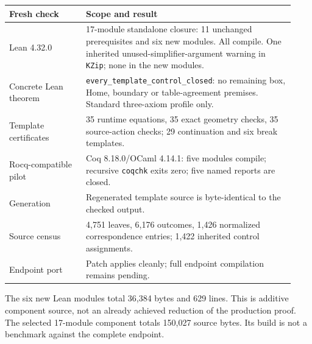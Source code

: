 \begin{center}
\begin{tabular}{@{}p{0.25\linewidth}p{0.68\linewidth}@{}}
\toprule Fresh check & Scope and result\\\midrule
Lean 4.32.0 & 17-module standalone closure: 11 unchanged prerequisites and six new modules. All compile. One inherited unused-simplifier-argument warning in \texttt{KZip}; none in the new modules.\\
Concrete Lean theorem & \texttt{every\_template\_control\_closed}: no remaining box, Home, boundary or table-agreement premises. Standard three-axiom profile only.\\
Template certificates & 35 runtime equations, 35 exact geometry checks, 35 source-action checks; 29 continuation and six break templates.\\
Rocq-compatible pilot & Coq 8.18.0/OCaml 4.14.1: five modules compile; recursive \texttt{coqchk} exits zero; five named reports are closed.\\
Generation & Regenerated template source is byte-identical to the checked output.\\
Source census & 4,751 leaves, 6,176 outcomes, 1,426 normalized correspondence entries; 1,422 inherited control assignments.\\
Endpoint port & Patch applies cleanly; full endpoint compilation remains pending.\\
\bottomrule
\end{tabular}
\end{center}
The six new Lean modules total 36,384 bytes and 629 lines. This is additive component source, not an already achieved reduction of the production proof. The selected 17-module component totals 150,027 source bytes. Its build is not a benchmark against the complete endpoint.

